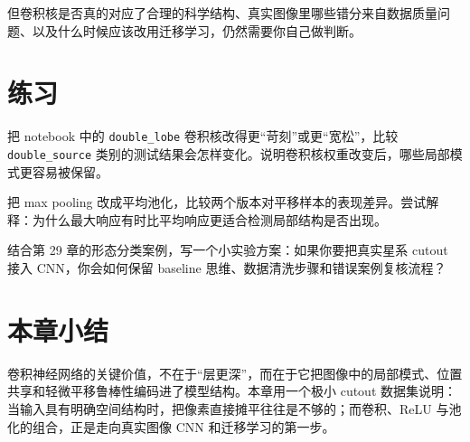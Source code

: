 但卷积核是否真的对应了合理的科学结构、真实图像里哪些错分来自数据质量问题、以及什么时候应该改用迁移学习，仍然需要你自己做判断。

\section{练习}

\begin{exercisebox}[基础练习]
把 notebook 中的 \texttt{double\_lobe} 卷积核改得更“苛刻”或更“宽松”，比较 \texttt{double\_source} 类别的测试结果会怎样变化。说明卷积核权重改变后，哪些局部模式更容易被保留。
\end{exercisebox}

\begin{exercisebox}[进阶练习]
把 max pooling 改成平均池化，比较两个版本对平移样本的表现差异。尝试解释：为什么最大响应有时比平均响应更适合检测局部结构是否出现。
\end{exercisebox}

\begin{exercisebox}[开放练习]
结合第 29 章的形态分类案例，写一个小实验方案：如果你要把真实星系 cutout 接入 CNN，你会如何保留 baseline 思维、数据清洗步骤和错误案例复核流程？
\end{exercisebox}

\section{本章小结}

卷积神经网络的关键价值，不在于“层更深”，而在于它把图像中的局部模式、位置共享和轻微平移鲁棒性编码进了模型结构。本章用一个极小 cutout 数据集说明：当输入具有明确空间结构时，把像素直接摊平往往是不够的；而卷积、ReLU 与池化的组合，正是走向真实图像 CNN 和迁移学习的第一步。
